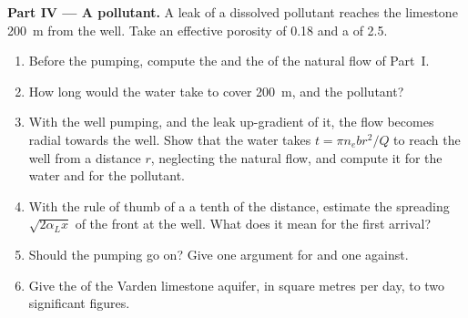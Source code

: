 \begin{problem}
\medskip\noindent\textbf{Part IV --- A pollutant.} A leak of a dissolved
pollutant reaches the limestone \qty{200}{m} from the well. Take an
effective porosity of 0.18 and a  of 2.5.
\begin{enumerate}[resume]
\item Before the pumping, compute the  and the  of the natural flow of Part~I.
\item How long would the water take to cover \qty{200}{m}, and the
  pollutant?
\item With the well pumping, and the leak up-gradient of it, the flow
  becomes radial towards the well. Show that the water takes $t = \pi n_e b
  r^2/Q$ to reach the well from a distance $r$, neglecting the natural
  flow, and compute it for the water and for the pollutant.
\item With the rule of thumb of a  a tenth of the distance,
  estimate the spreading $\sqrt{2\alpha_Lx}$ of the front at the well. What
  does it mean for the first arrival?
\item Should the pumping go on? Give one argument for and one against.
\item Give the  of the Varden limestone aquifer, in square
  metres per day, to two significant figures.
\end{enumerate}
\end{problem}
